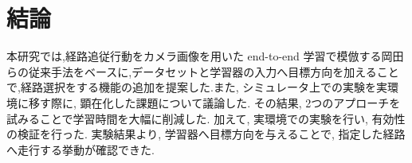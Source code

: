 \chapter{結論}
\label{chap:end}
本研究では,経路追従行動をカメラ画像を用いた end-to-end 学習で模倣する岡田らの従来手法をベースに,データセットと学習器の入力へ目標方向を加えることで,経路選択をする機能の追加を提案した.また, シミュレータ上での実験を実環境に移す際に, 顕在化した課題について議論した. その結果, 2つのアプローチを試みることで学習時間を大幅に削減した. 加えて, 実環境での実験を行い, 有効性の検証を行った. 実験結果より, 学習器へ目標方向を与えることで, 指定した経路へ走行する挙動が確認できた.

%
%
% 
%
